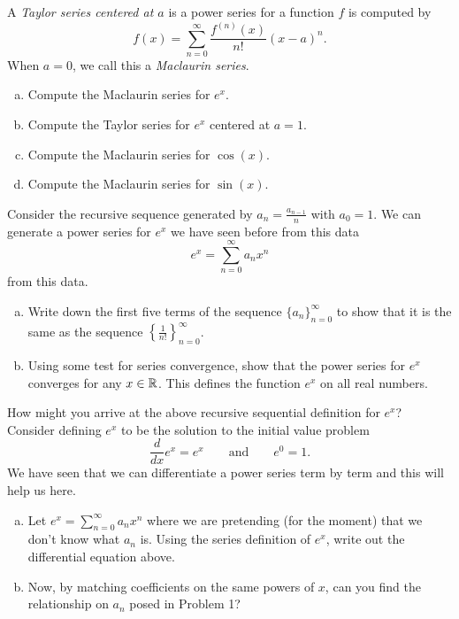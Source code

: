 \begin{problem}
A \emph{Taylor series centered at $a$} is a power series for a function $f$ is computed by
\[
f(x) = \sum_{n=0}^\infty \frac{f^{(n)}(x)}{n!}(x-a)^n.
\]
When $a=0$, we call this a \emph{Maclaurin series}.
\begin{enumerate}[(a)]
    \item Compute the Maclaurin series for $e^x$.
    \item Compute the Taylor series for $e^x$ centered at $a=1$.
    \item Compute the Maclaurin series for $\cos(x)$.
    \item Compute the Maclaurin series for $\sin(x)$.
\end{enumerate}
\end{problem}

\begin{problem}
Consider the recursive sequence generated by $a_n = \frac{a_{n-1}}{n}$ with $a_0=1$.  We can generate a power series for $e^x$ we have seen before from this data
\[
e^x=\sum_{n=0}^\infty a_n x^n
\]
from this data.
\begin{enumerate}[(a)]
    \item Write down the first five terms of the sequence $\{a_n\}_{n=0}^\infty$ to show that it is the same as the sequence $\left\{\frac{1}{n!}\right\}_{n=0}^\infty$.
    \item Using some test for series convergence, show that the power series for $e^x$ converges for any $x\in \mathbb{R}$. This defines the function $e^x$ on all real numbers.
\end{enumerate}
\end{problem}

\begin{problem}
How might you arrive at the above recursive sequential definition for $e^x$? Consider defining $e^x$ to be the solution to the initial value problem
\[
\frac{d}{dx} e^x = e^x \qquad \textrm{and} \qquad e^0=1.
\]
We have seen that we can differentiate a power series term by term and this will help us here.
\begin{enumerate}[(a)]
    \item Let $e^x = \sum_{n=0}^\infty a_n x^n$ where we are pretending (for the moment) that we don't know what $a_n$ is.  Using the series definition of $e^x$, write out the differential equation above.
    \item Now, by matching coefficients on the same powers of $x$, can you find the relationship on $a_n$ posed in Problem 1?
\end{enumerate}
\end{problem}

